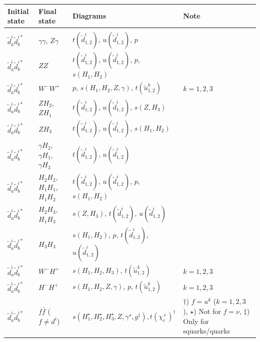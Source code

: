 \documentclass[a4paper,10pt,oneside]{book}
\newcommand{\tabspace}{\\[-2.5ex]}
\begin{document}
{\small
\begin{center}
\begin{tabular}{llll} \hline
{\bfseries Initial state} & {\bfseries Final state} &
{\bfseries Diagrams} & {\bfseries Note} \\ \hline \tabspace
$\tilde{d}^i_a \tilde{d}^{i*}_{b}$ & $\gamma \gamma$, $Z \gamma$ &
$t(\tilde{d}^i_{1,2})$, $u(\tilde{d}^i_{1,2})$, $p$ \\
$\tilde{d}^i_a\tilde{d}^{i*}_b$ & $Z Z$ &
$t(\tilde{d}^i_{1,2})$, $u(\tilde{d}^i_{1,2})$, $p$, $s(H_{1},H_{2})$ \\
$\tilde{d}^i_a\tilde{d}^{i*}_b$ & $W^-W^+$ &
$p$, $s(H_{1},H_{2},Z,\gamma)$, $t(\tilde{u}^k_{1,2})$ 
& $k=1,2,3$\\
$\tilde{d}^i_a\tilde{d}^{i*}_b$ & $Z H_{2}$, $Z H_{1}$ &
$t(\tilde{d}^i_{1,2})$, $u(\tilde{d}^i_{1,2})$, $s(Z,H_3)$ \\
$\tilde{d}^i_a\tilde{d}^{i*}_b$ & $Z H_{3}$ &
$t(\tilde{d}^i_{1,2})$, $u(\tilde{d}^i_{1,2})$, $s(H_{1},H_{2})$ \\
$\tilde{d}^i_a\tilde{d}^{i*}_b$ & $\gamma H_{2}$, $\gamma H_{1}$, $\gamma H_{3}$ &
$t(\tilde{d}^i_{1,2})$, $u(\tilde{d}^i_{1,2})$  \\
$\tilde{d}^i_a\tilde{d}^{i*}_b$ & $H_{2} H_{2}$, $H_{1} H_{1}$, 
$H_{1} H_{2}$ &
$t(\tilde{d}^i_{1,2})$, $u(\tilde{d}^i_{1,2})$, $p$, $s(H_{1},H_{2})$ \\
$\tilde{d}^i_a \tilde{d}^{i*}_b$ & $H_{2} H_{3}$, $H_{1} H_{3}$ &
$s(Z,H_3)$, $t(\tilde{d}^i_{1,2})$, $u(\tilde{d}^i_{1,2})$ \\
$\tilde{d}^i_a\tilde{d}^{i*}_b$ & $H_{3} H_{3}$ &
$s(H_{1},H_{2})$, $p$, $t(\tilde{d}^i_{1,2})$, $u(\tilde{d}^i_{1,2})$ \\
$\tilde{d}^i_a\tilde{d}^{i*}_b$ & $W^- H^+$ &
$s(H_{1},H_{2},H_3)$, $t(\tilde{u}^k_{1,2})$ 
& $k=1,2,3$\\
$\tilde{d}^i_a\tilde{d}^{i*}_b$ & $H^- H^+$ &
$s(H_{1},H_{2},Z,\gamma)$, $p$, $t(\tilde{u}^k_{1,2})$ 
& $k=1,2,3$\\
$\tilde{d}^i_a\tilde{d}^{i*}_b$ & $f \bar{f}$ ($f \ne d^i$) &
$s(H_{1}^\star,H_{2}^\star,H_{3}^\star,Z,\gamma^\star,g^\ddagger), t(\chi_c^+)^\dagger$ 
& \parbox[t]{4cm}{$\dagger$) $f=u^k$ ($k=1,2,3$ ), $\star$) Not for $f=\nu$, 
$\ddagger$) Only for squarks/quarks} \\
$\tilde{d}^i_a\tilde{d}^{i*}_b$ & $d^i \bar{d}^i$ &

\end{tabular}
\end{center}}
\end{document}
